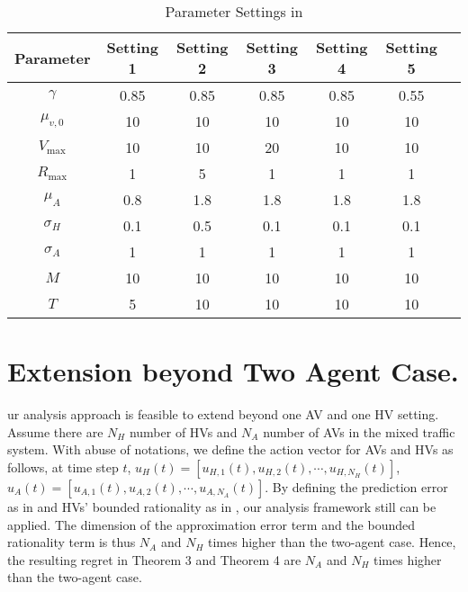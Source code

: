 {\begin{table}[h!]
    \centering
    \begin{tabular}{c|cccccc}
        Parameter & Setting 1 & Setting 2 & Setting 3 & Setting 4 & Setting 5 \\ \toprule 
        $\gamma$ & 0.85 & 0.85 & 0.85 & 0.85 & 0.55  \\
        $\mu_{v,0}$ & 10 & 10 & 10 & 10 & 10 \\
        $V_{\max}$ & 10 & 10 & 20 & 10 & 10\\
        $R_{\max}$ & 1 & 5 & 1 & 1 & 1\\
        $\mu_A$ & 0.8 & 1.8 & 1.8 & 1.8 & 1.8\\
        $\sigma_H$ &  0.1 &  0.5 &  0.1 &  0.1 &  0.1\\
        $\sigma_A$ & 1 & 1 & 1 & 1 & 1 \\
        $M$ & 10 &  10 &  10 &  10 &  10 \\
        $T$ & 5 & 10  & 10 & 10 & 10\\
    \end{tabular}
    \caption{Parameter Settings in }
    \label{tab:set3}
\end{table}


\section{Extension beyond Two Agent Case.}\label{app:beyond}

ur analysis approach is feasible to extend beyond one AV and one HV setting. Assume there are $N_H$ number of HVs and $N_A$ number of AVs in the mixed traffic system. With abuse of notations, we define the action vector for AVs and HVs as follows, at time step $t$, $u_H(t) = [u_{H,1}(t), u_{H,2}(t),\cdots, u_{H,N_H}(t)]$, $ u_A(t) = [u_{A,1}(t), u_{A,2}(t),\cdots, u_{A,N_A}(t)]$. By defining the prediction error as in  and HVs' bounded rationality as in , our analysis framework still can be applied. The dimension of the approximation error term and the bounded rationality term is thus $N_A$ and $N_H$ times higher than the two-agent case. Hence, the resulting regret in Theorem 3 and Theorem 4 are $N_A$ and $N_H$ times higher than the two-agent case. 

}